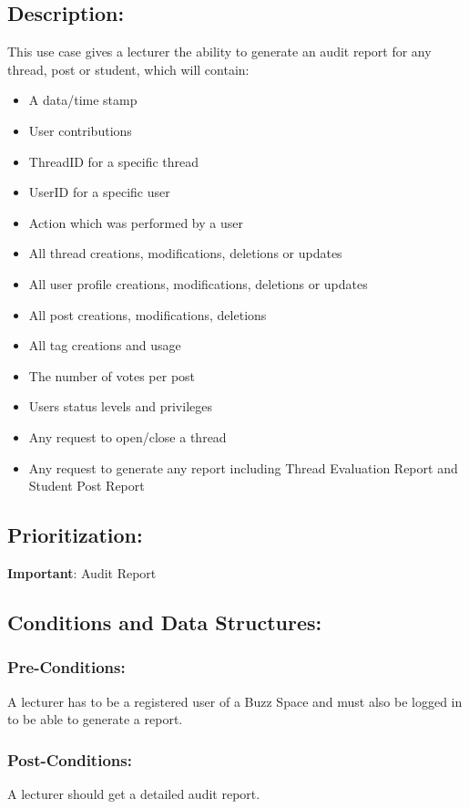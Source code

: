 \documentclass[a4paper,11pt]{article}
\begin{document}
\subsection*{Description:}
This use case gives a lecturer the ability to generate an audit report for any thread, post or student, which will contain:
\begin{itemize}
\item A data/time stamp
\item User contributions
\item ThreadID for a specific thread
\item UserID for a specific user
\item Action which was performed by a user
\item All thread creations, modifications, deletions or updates
\item All user profile creations, modifications, deletions or updates
\item All post creations, modifications, deletions
\item All tag creations and usage
\item The number of votes per post
\item Users status levels and privileges
\item Any request to open/close a thread
\item Any request to generate any report including Thread Evaluation Report and Student Post Report
\end{itemize}

\subsection{Prioritization:} 
\textbf{Important}: Audit Report
\subsection{Conditions and Data Structures:}
\subsubsection*{Pre-Conditions:}
A lecturer has to be a registered user of a Buzz Space and must also be logged in to be able to generate a report.\\
\subsubsection*{Post-Conditions:}
A lecturer should get a detailed audit report.\\
\end{document}
